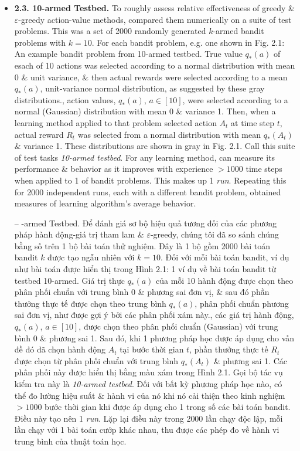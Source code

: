 \documentclass{article}
\newtheorem{problem}{Problem}
\begin{document}
\begin{itemize}
\begin{itemize}
\begin{problem}
            -- Trong lựa chọn hành động tham lam $\varepsilon$, đối với trường hợp 2 hành động \& $\varepsilon = 0,5$, xác suất hành động tham lam được chọn là bao nhiêu?
        \end{problem}
        \item {\bf2.3. 10-armed Testbed.} To roughly assess relative effectiveness of greedy \& $\varepsilon$-greedy action-value methods, compared them numerically on a suite of test problems. This was a set of 2000 randomly generated $k$-armed bandit problems with $k = 10$. For each bandit problem, e.g. one shown in {\sf Fig. 2.1: An example bandit problem from 10-armed testbed. True value $q_*(a)$ of esach of 10 actions was selected according to a normal distribution with mean 0 \& unit variance, \& then actual rewards were selected according to a mean $q_*(a)$, unit-variance normal distribution, as suggested by these gray distributions.}, action values, $q_*(a)$, $a\in[10]$, were selected according to a normal (Gaussian) distribution with mean 0 \& variance 1. Then, when a learning method applied to that problem selected action $A_t$ at time step $t$, actual reward $R_t$ was selected from a normal distribution with mean $q_*(A_t)$ \& variance 1. These distributions are shown in gray in Fig. 2.1. Call this suite of test tasks {\it10-armed testbed}. For any learning method, can measure its performance \& behavior as it improves with experience $> 1000$ time steps when applied to 1 of bandit problems. This makes up 1 {\it run}. Repeating this for 2000 independent runs, each with a different bandit problem, obtained measures of learning algorithm's average behavior.

        -- {-armed Testbed.} Để đánh giá sơ bộ hiệu quả tương đối của các phương pháp hành động-giá trị tham lam \& $\varepsilon$-greedy, chúng tôi đã so sánh chúng bằng số trên 1 bộ bài toán thử nghiệm. Đây là 1 bộ gồm 2000 bài toán bandit $k$ được tạo ngẫu nhiên với $k = 10$. Đối với mỗi bài toán bandit, ví dụ như bài toán được hiển thị trong {\sf Hình 2.1: 1 ví dụ về bài toán bandit từ testbed 10-armed. Giá trị thực $q_*(a)$ của mỗi 10 hành động được chọn theo phân phối chuẩn với trung bình 0 \& phương sai đơn vị, \& sau đó phần thưởng thực tế được chọn theo trung bình $q_*(a)$, phân phối chuẩn phương sai đơn vị, như được gợi ý bởi các phân phối xám này.}, các giá trị hành động, $q_*(a)$, $a\in[10]$, được chọn theo phân phối chuẩn (Gaussian) với trung bình 0 \& phương sai 1. Sau đó, khi 1 phương pháp học được áp dụng cho vấn đề đó đã chọn hành động $A_t$ tại bước thời gian $t$, phần thưởng thực tế $R_t$ được chọn từ phân phối chuẩn với trung bình $q_*(A_t)$ \& phương sai 1. Các phân phối này được hiển thị bằng màu xám trong Hình 2.1. Gọi bộ tác vụ kiểm tra này là {\it10-armed testbed}. Đối với bất kỳ phương pháp học nào, có thể đo lường hiệu suất \& hành vi của nó khi nó cải thiện theo kinh nghiệm $> 1000$ bước thời gian khi được áp dụng cho 1 trong số các bài toán bandit. Điều này tạo nên 1 {\it run}. Lặp lại điều này trong 2000 lần chạy độc lập, mỗi lần chạy với 1 bài toán cướp khác nhau, thu được các phép đo về hành vi trung bình của thuật toán học.


\end{itemize}
\end{itemize}
\end{document}
